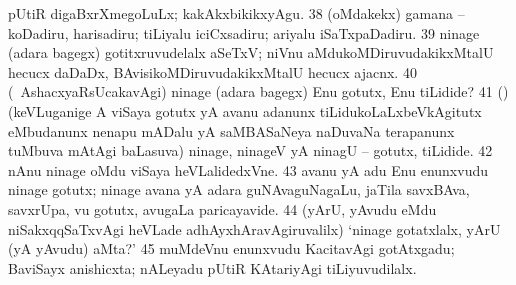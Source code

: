 {{ pUtiR
digaBxrXmegoLuLx; kakAkxbikikxyAgu. 
\num{38}  (oMdakekx)
gamana -- koDadiru, harisadiru; tiLiyalu iciCxsadiru; ariyalu iSaTxpaDadiru.
\num{39}  ninage (adara bagegx) gotitxruvudelalx aSeTxV; niVnu aMdukoMDiruvudakikxMtalU hecucx daDaDx, BAvisikoMDiruvudakikxMtalU hecucx ajacnx. 
\num{40}  (\AmA\ AshacxyaRsUcakavAgi)
ninage (adara bagegx) Enu gotutx, Enu tiLidide? 
\num{41}  (\AmA) (keVLuganige A viSaya gotutx yA avanu adanunx tiLidukoLaLxbeVkAgitutx eMbudanunx nenapu mADalu yA saMBASaNeya naDuvaNa terapanunx tuMbuva mAtAgi baLasuva)
ninage, ninageV yA ninagU -- gotutx, tiLidide. 
\num{42}  nAnu ninage oMdu viSaya heVLalidedxVne. 
\num{43}  avanu yA adu Enu enunxvudu ninage gotutx; ninage avana yA adara guNAvaguNagaLu, jaTila savxBAva, savxrUpa, \mo vu gotutx,
avugaLa paricayavide. 
\num{44}  (yArU, yAvudu eMdu niSakxqqSaTxvAgi heVLade adhAyxhAravAgiruvalilx) `ninage gotatxlalx, 
yArU (yA yAvudu) aMta?'
\num{45}  muMdeVnu enunxvudu KacitavAgi gotAtxgadu; BaviSayx anishicxta; nALeyadu pUtiR KAtariyAgi tiLiyuvudilalx.}}
\eentry

\bentry
{}
\gl{\nA}
{}

\noindent
\gl{\nuga}
\eentry

\bentry
{}
\gl{\nA}
\eentry

\bentry
{}
\gl{\gu}
\eentry

\bentry
{}
\gl{\nA}
\eentry

\bentry
{}
\gl{\nA}
\eentry

\bentry
{}
\gl{\nA}
\eentry

